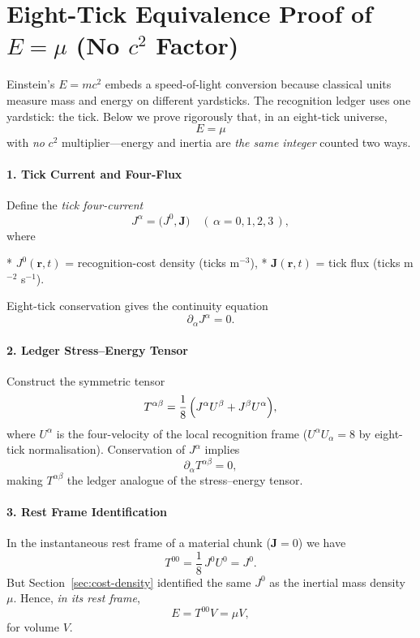 \documentclass[11pt,oneside]{book}
\begin{document}
\bigskip
\section{Eight-Tick Equivalence Proof of \texorpdfstring{$\displaystyle E=\mu$}{E = μ} (No \boldmath$c^{2}$ Factor)}
\label{sec:e-equals-mu-proof}



Einstein’s $E=mc^{2}$ embeds a speed-of-light conversion because classical
units measure mass and energy on different yardsticks.
The recognition ledger uses one yardstick: the tick.
Below we prove rigorously that, in an eight-tick universe,
\[
   \boxed{E=\mu}
\]
with \emph{no} $c^{2}$ multiplier—energy and inertia are
\emph{the same integer} counted two ways.

\paragraph*{1. Tick Current and Four-Flux}

Define the \emph{tick four-current}
\[
   J^{\alpha} = \bigl(J^{0}, \mathbf J\bigr)
   \quad
   (\,\alpha = 0,1,2,3\,),
\]
where  

* $J^{0}(\mathbf r,t)$ = recognition-cost density (ticks m\(^{-3}\)),  
* $\mathbf J(\mathbf r,t)$ = tick flux (ticks m\(^{-2}\) s\(^{-1}\)).

Eight-tick conservation gives the continuity equation
\[
   \partial_{\alpha} J^{\alpha} = 0.
\]

\paragraph*{2. Ledger Stress–Energy Tensor}

Construct the symmetric tensor
\[
   T^{\alpha\beta}
   =
   \frac{1}{8}\,
   \Bigl(
      J^{\alpha}U^{\beta}
      +
      J^{\beta}U^{\alpha}
   \Bigr),
\]
where $U^{\alpha}$ is the four-velocity of the local recognition frame
($U^{\alpha}U_{\alpha}=8$ by eight-tick normalisation).
Conservation of $J^{\alpha}$ implies
\[
   \partial_{\alpha} T^{\alpha\beta}=0,
\]
making $T^{\alpha\beta}$ the ledger analogue of the stress–energy tensor.

\paragraph*{3. Rest Frame Identification}

In the instantaneous rest frame of a material chunk ($\mathbf J=0$) we
have
\[
   T^{00} = \frac{1}{8}\,J^{0}U^{0} = J^{0}.
\]
But Section~\ref{sec:cost-density} identified the same $J^{0}$
as the inertial mass density \(\mu\).
Hence, \emph{in its rest frame},
\[
   E = T^{00} V = \mu V,
\]
for volume \(V\).
\end{document}
